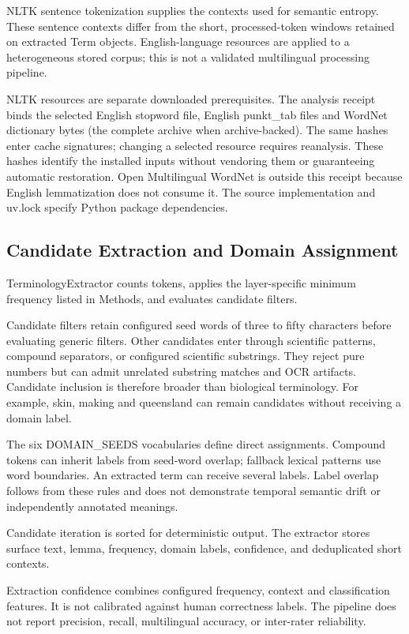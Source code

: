 \documentclass[
]{article}
\numberwithin{equation}{section}
\begin{document}
NLTK sentence tokenization supplies the contexts used for semantic
entropy. These sentence contexts differ from the short, processed-token
windows retained on extracted Term objects. English-language resources
are applied to a heterogeneous stored corpus; this is not a validated
multilingual processing pipeline.

NLTK resources are separate downloaded prerequisites. The analysis
receipt binds the selected English stopword file, English punkt\_tab
files and WordNet dictionary bytes (the complete archive when
archive-backed). The same hashes enter cache signatures; changing a
selected resource requires reanalysis. These hashes identify the
installed inputs without vendoring them or guaranteeing automatic
restoration. Open Multilingual WordNet is outside this receipt because
English lemmatization does not consume it. The source implementation and
uv.lock specify Python package dependencies.

\subsection{Candidate Extraction and Domain
Assignment}\label{candidate-extraction-and-domain-assignment}

TerminologyExtractor counts tokens, applies the layer-specific minimum
frequency listed in Methods, and evaluates candidate filters.

Candidate filters retain configured seed words of three to fifty
characters before evaluating generic filters. Other candidates enter
through scientific patterns, compound separators, or configured
scientific substrings. They reject pure numbers but can admit unrelated
substring matches and OCR artifacts. Candidate inclusion is therefore
broader than biological terminology. For example, skin, making and
queensland can remain candidates without receiving a domain label.

The six DOMAIN\_SEEDS vocabularies define direct assignments. Compound
tokens can inherit labels from seed-word overlap; fallback lexical
patterns use word boundaries. An extracted term can receive several
labels. Label overlap follows from these rules and does not demonstrate
temporal semantic drift or independently annotated meanings.

Candidate iteration is sorted for deterministic output. The extractor
stores surface text, lemma, frequency, domain labels, confidence, and
deduplicated short contexts.

Extraction confidence combines configured frequency, context and
classification features. It is not calibrated against human correctness
labels. The pipeline does not report precision, recall, multilingual
accuracy, or inter-rater reliability.
\end{document}
